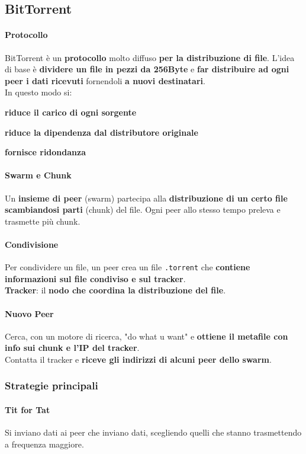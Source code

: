\documentclass[10pt]{article}
\begin{document}
{\subsection{BitTorrent}
\paragraph{Protocollo} BitTorrent è un \textbf{protocollo} molto diffuso \textbf{per la distribuzione di file}. L'idea di base è \textbf{dividere un file in pezzi da 256Byte} e \textbf{far distribuire ad ogni peer i dati ricevuti} fornendoli \textbf{a nuovi destinatari}.\\
In questo modo si:
\begin{list}{}{}
	\item \textbf{riduce il carico di ogni sorgente}
	\item \textbf{riduce la dipendenza dal distributore originale}
	\item \textbf{fornisce ridondanza}
\end{list}
\paragraph{Swarm e Chunk} Un \textbf{insieme di peer} (swarm) partecipa alla \textbf{distribuzione di un certo file scambiandosi parti} (chunk) del file. Ogni peer allo stesso tempo preleva e trasmette più chunk.
\paragraph{Condivisione} Per condividere un file, un peer crea un file \texttt{.torrent} che \textbf{contiene informazioni sul file condiviso e sul tracker}.\\
\textbf{Tracker}: il \textbf{nodo che coordina la distribuzione del file}.
\paragraph{Nuovo Peer} Cerca, con un motore di ricerca, "do what u want" e \textbf{ottiene il metafile con info sui chunk e l'IP del tracker}.\\
Contatta il tracker e \textbf{riceve gli indirizzi di alcuni peer dello swarm}.
\subsubsection{Strategie principali}
\paragraph{Tit for Tat} Si inviano dati ai peer che inviano dati, scegliendo quelli che stanno trasmettendo a frequenza maggiore.
}
\end{document}
